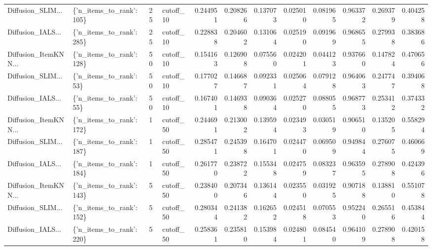 \begin{tabular}{llllrrrrrrrr}
Diffusion\_SLIM... & \{'n\_items\_to\_rank': 105\} &       25 & cutoff\_10 & 0.244951 &   0.208266 & 0.137073 & 0.025010 &        0.081965 &                   0.963372 &       0.269379 &            0.404258 \\
Diffusion\_IALS... & \{'n\_items\_to\_rank': 285\} &       25 & cutoff\_10 & 0.228838 &   0.204602 & 0.131064 & 0.025190 &        0.091969 &                   0.968655 &       0.279938 &            0.383686 \\
Diffusion\_ItemKNN... & \{'n\_items\_to\_rank': 128\} &       50 & cutoff\_10 & 0.154163 &   0.126908 & 0.075560 & 0.024201 &        0.044123 &                   0.937660 &       0.147824 &            0.470656 \\
Diffusion\_SLIM... &  \{'n\_items\_to\_rank': 53\} &       50 & cutoff\_10 & 0.177027 &   0.146687 & 0.092331 & 0.025064 &        0.079128 &                   0.964063 &       0.247747 &            0.394068 \\
Diffusion\_IALS... &  \{'n\_items\_to\_rank': 55\} &       50 & cutoff\_10 & 0.167401 &   0.146938 & 0.090364 & 0.025270 &        0.088055 &                   0.968773 &       0.253412 &            0.374332 \\
Diffusion\_ItemKNN... & \{'n\_items\_to\_rank': 172\} &        1 & cutoff\_50 & 0.244691 &   0.213002 & 0.139594 & 0.023493 &        0.030519 &                   0.906510 &       0.135205 &            0.558294 \\
Diffusion\_SLIM... & \{'n\_items\_to\_rank': 187\} &        1 & cutoff\_50 & 0.285471 &   0.245398 & 0.164701 & 0.024470 &        0.069509 &                   0.949844 &       0.276075 &            0.460669 \\
Diffusion\_IALS... & \{'n\_items\_to\_rank': 184\} &        1 & cutoff\_50 & 0.261770 &   0.238722 & 0.155348 & 0.024759 &        0.083237 &                   0.963595 &       0.278908 &            0.424396 \\
Diffusion\_ItemKNN... & \{'n\_items\_to\_rank': 143\} &        5 & cutoff\_50 & 0.238400 &   0.207346 & 0.136144 & 0.023550 &        0.031925 &                   0.907188 &       0.138810 &            0.551078 \\
Diffusion\_SLIM... & \{'n\_items\_to\_rank': 152\} &        5 & cutoff\_50 & 0.280344 &   0.241382 & 0.162652 & 0.024518 &        0.070553 &                   0.952240 &       0.265516 &            0.453844 \\
Diffusion\_IALS... & \{'n\_items\_to\_rank': 220\} &        5 & cutoff\_50 & 0.258361 &   0.235810 & 0.153984 & 0.024801 &        0.084540 &                   0.964109 &       0.278908 &            0.420158 \\

\end{tabular}
